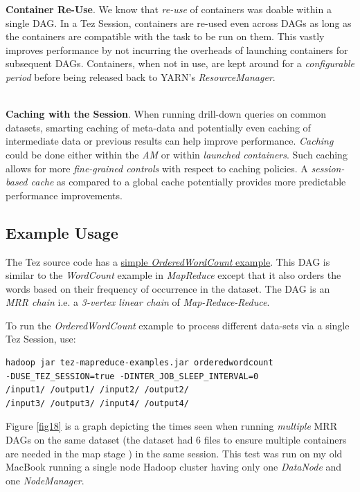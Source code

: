 \documentclass[twocolumn]{article}
\begin{document}
\textbf{Container Re-Use}. We know that \emph{re-use} of containers was
doable within a single DAG. In a Tez Session, containers are re-used
even across DAGs as long as the containers are compatible with the task
to be run on them. This vastly improves performance by not incurring the
overheads of launching containers for subsequent DAGs. Containers, when
not in use, are kept around for a \emph{configurable period} before
being released back to YARN's \emph{ResourceManager}.

\noindent
\\
\textbf{Caching with the Session}. When running drill-down queries on
common datasets, smarting caching of meta-data and potentially even
caching of intermediate data or previous results can help improve
performance. \emph{Caching} could be done either within the \emph{AM}
or within \emph{launched containers}. Such caching allows for more
\emph{fine-grained controls} with respect to caching policies. A
\emph{session-based cache} as compared to a global cache potentially
provides more predictable performance improvements.

\subsection{Example Usage}

The Tez source code has a
\href{https://git-wip-us.apache.org/repos/asf?p=incubator-tez.git;a=blob_plain;f=tez-mapreduce-examples/src/main/java/org/apache/tez/mapreduce/examples/OrderedWordCount.java;hb=master}{simple
\emph{OrderedWordCount} example}. This DAG is similar to the
\emph{WordCount} example in \emph{MapReduce} except that it also
orders the words based on their frequency of occurrence in the dataset.
The DAG is an \emph{MRR chain} i.e. a \emph{3-vertex linear chain} of
\emph{Map-Reduce-Reduce}.

To run the \emph{OrderedWordCount} example to process different
data-sets via a single Tez Session, use:

{\footnotesize
\begin{verbatim}
hadoop jar tez-mapreduce-examples.jar orderedwordcount 
-DUSE_TEZ_SESSION=true -DINTER_JOB_SLEEP_INTERVAL=0
/input1/ /output1/ /input2/ /output2/ 
/input3/ /output3/ /input4/ /output4/
\end{verbatim}
}

Figure \ref{fig18} is a graph depicting the times seen when running \emph{multiple}
MRR DAGs on the same dataset (the dataset had 6 files to ensure multiple
containers are needed in the map stage ) in the same session. This test
was run on my old MacBook running a single node Hadoop cluster having
only one \emph{DataNode} and one \emph{NodeManager}.
\end{document}
